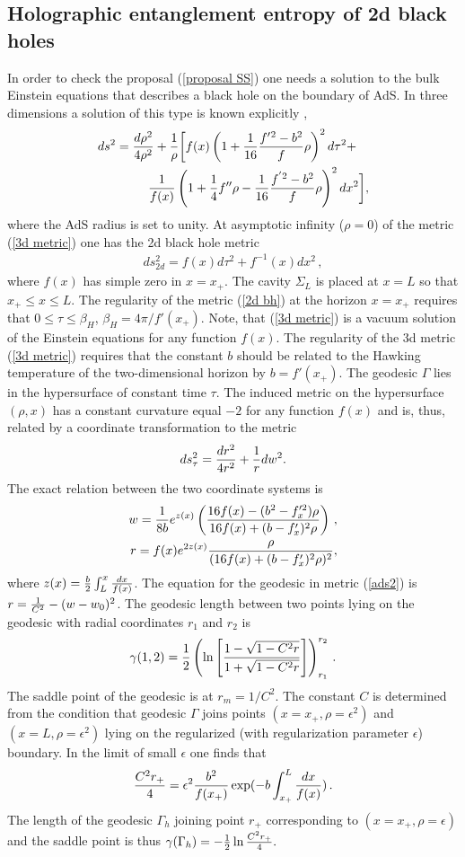 \documentclass[12pt]{article}
\def\r{\rho}
\def\be{\begin{eqnarray}}
\def\ee{\end{eqnarray}}
\def\lb{\label}
\begin{document}
\subsection{Holographic entanglement entropy of 2d black holes}
In order to check the  proposal (\ref{proposal SS}) one needs  a solution to the bulk
Einstein equations that describes a black hole on the boundary of
AdS. In three dimensions a solution of this type is known
explicitly \cite{Skenderis:1999nb},
\be
\begin{multlined}
ds^2 = {d\rho^2\over
4\rho^2} + {1 \over \r} \biggl[f(x)\left(1 + {1\over 16}{f'{}^2- b^2
\over f}\r\right)^2
 d\tau^2  + \\ 
 {1 \over f(x)}\left( 1 +{1\over 4} f'' \r - {1 \over
16}{f^{' 2}- b^2 \over f}\r\right)^2 dx^2 \biggr],
\label{3d metric}
\end{multlined}
\ee
where   the AdS radius is set to unity. At asymptotic infinity
($\r=0$) of  the metric (\ref{3d metric}) one has the 2d black hole
metric 
\be
ds^2_{2d}=f(x)d\tau^2+f^{-1}(x)dx^2\, ,
\lb{2d bh}
\ee
where $f(x)$ has simple zero in $x=x_+$.  The cavity $\Sigma_L$ is placed at $x=L$ so that
$x_+\leq x\leq L$. The regularity of the metric (\ref{2d bh}) at the horizon $x=x_+$ requires that
$0\leq \tau\leq \beta_H$, $\beta_H=4\pi/f'(x_+)$.
 Note, that (\ref{3d metric}) is a vacuum solution
of the Einstein equations for any function $f(x)$.
 The regularity of the 3d metric (\ref{3d metric}) requires that the constant
$b$ should be related to the Hawking temperature of the
two-dimensional horizon by $b=f'(x_+)$. The geodesic $\Gamma$ lies
in the hypersurface of constant time $\tau$. The induced metric on
the hypersurface $(\rho , x)$  has a constant curvature equal $-2$
for any function $f(x)$ and is, thus, related by a coordinate
transformation to the metric 
\be ds_\tau^2={dr^2\over 4r^2}+{1\over
r}dw^2. 
\lb{ads2} 
\ee 
The exact relation between the two
coordinate systems is 
\be
w={1\over 8b}e^{z(x)}\left({16f(x)-(b^2-f'^2_x)\r\over 16f(x)+(b-f'_x)^2\r}\right)\, ,\nonumber \\
r=f(x){e^{2z(x)}}{\r\over (16f(x)+(b-f'_x)^2\r)^2}, 
\lb{trans} \ee
where $z(x)={b\over 2}\int_L^x {dx\over f(x)}$. The equation for
the geodesic in metric (\ref{ads2}) is $r={1\over C^2}-(w-w_0)^2$.
The geodesic length between two points lying on the geodesic  with radial coordinates
$r_1$ and $r_2$ is 
$$\gamma(1,2)={1\over 2}\left(\ln
\left[{1-\sqrt{1-C^2r}\over 1+\sqrt{1-C^2r}}\right]\right)_{r_1}^{r_2}\, .
$$
The saddle point of the geodesic is at $r_m=1/C^2$. 
 The constant $C$ is determined from the condition that
geodesic $\Gamma$ joins points $(x=x_+,\rho=\epsilon^2)$ and
$(x=L,\rho=\epsilon^2)$ lying on the regularized (with
regularization parameter $\epsilon$) boundary. In the limit of small $\epsilon$ one finds that
$$
{C^2 r_+\over 4}=\epsilon^2{b^2\over
f(x_+)}\exp(-b\int^L_{x_+}{dx\over f(x)}) \, .
$$
The length of
the geodesic $\Gamma_h$ joining point $r_+$ corresponding to
$(x=x_+,\rho=\epsilon)$ and the saddle point is thus  $\gamma
(\Gamma_h)=-{1\over 2}\ln{C^2r_+\over 4}. $
\end{document}
